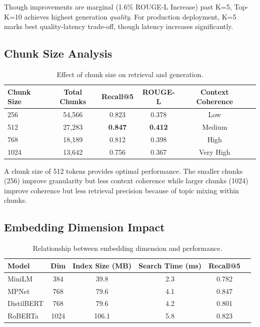 \documentclass[runningheads]{llncs}
\begin{document}
Though improvements are marginal (1.6\% ROUGE-L Increase) past K=5, Top-K=10 achieves highest generation \textit{quality}. For production deployment, K=5 marks best quality-latency trade-off, though latency increases significantly.





\subsection{Chunk Size Analysis}

\begin{table}[h]
\centering
\caption{Effect of chunk size on retrieval and generation.}
\label{tab:chunk_ablation}
\begin{tabular}{lccccc}
\toprule
\textbf{Chunk Size} & \textbf{Total Chunks} & \textbf{Recall@5} & \textbf{ROUGE-L} & \textbf{Context Coherence} \\
\midrule
256 & 54,566 & 0.823 & 0.378 & Low \\
512 & 27,283 & \textbf{0.847} & \textbf{0.412} & Medium \\
768 & 18,189 & 0.812 & 0.398 & High \\
1024 & 13,642 & 0.756 & 0.367 & Very High \\
\bottomrule
\end{tabular}
\end{table}

A chunk size of 512 tokens provides optimal performance. The smaller chunks (256) improve granularity but less context coherence while larger chunks (1024) improve coherence but less retrieval precision because of topic mixing within chunks.





\subsection{Embedding Dimension Impact}

\begin{table}[h]
\centering
\caption{Relationship between embedding dimension and performance.}
\label{tab:dimension_ablation}
\begin{tabular}{lccccc}
\toprule
\textbf{Model} & \textbf{Dim} & \textbf{Index Size (MB)} & \textbf{Search Time (ms)} & \textbf{Recall@5} \\
\midrule
MiniLM & 384 & 39.8 & 2.3 & 0.782 \\
MPNet & 768 & 79.6 & 4.1 & 0.847 \\
DistilBERT & 768 & 79.6 & 4.2 & 0.801 \\
RoBERTa & 1024 & 106.1 & 5.8 & 0.823 \\
\bottomrule
\end{tabular}
\end{table}
\end{document}
